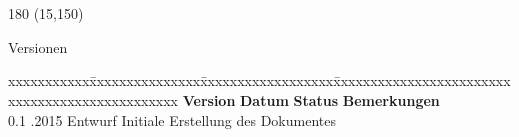 
\chapter*{}
\label{chap:versionen}

\begin{textblock}{180} (15,150)
\color{black}
\begin{huge}
Versionen
\end{huge}
\vspace{10mm}

\fontsize{10pt}{18pt}\selectfont
\begin{tabbing}
xxxxxxxxxxx\=xxxxxxxxxxxxxxx\=xxxxxxxxxxxxxxxxxx\=xxxxxxxxxxxxxxxxxxxxxxxxxxxxxxxxxxxxxxxxxxxxxxx     \kill
\textbf{Version}    \> \textbf{Datum}   \> \textbf{Status}      \> \textbf{Bemerkungen}               \\
0.1                 .2015       \> Entwurf              \> Initiale Erstellung des Dokumentes \\
\end{tabbing}

\end{textblock}

